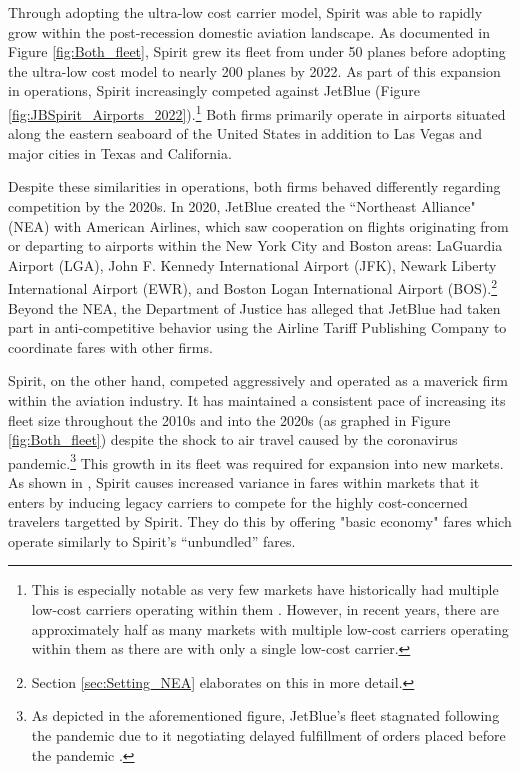\documentclass{article}
\begin{document}
     Through adopting the ultra-low cost carrier model, Spirit was able to rapidly grow within the post-recession domestic aviation landscape. As documented in Figure \ref{fig:Both_fleet}, Spirit grew its fleet from under 50 planes before adopting the ultra-low cost model to nearly 200 planes by 2022. As part of this expansion in operations, Spirit increasingly competed against JetBlue (Figure \ref{fig:JBSpirit_Airports_2022}).\footnote{This is especially notable as very few markets have historically had multiple low-cost carriers operating within them \citep{kwoka_fringe_2016, ciliberto_market_2021}. However, in recent years, there are approximately half as many markets with multiple low-cost carriers operating within them as there are with only a single low-cost carrier.} Both firms primarily operate in airports situated along the eastern seaboard of the United States in addition to Las Vegas and major cities in Texas and California.
	
	Despite these similarities in operations, both firms behaved differently regarding competition by the 2020s.  In 2020, JetBlue created the ``Northeast Alliance" (NEA) with American Airlines, which saw cooperation on flights originating from or departing to airports within the New York City and Boston areas: LaGuardia Airport (LGA), John F. Kennedy International Airport (JFK), Newark Liberty International Airport (EWR), and Boston Logan International Airport (BOS).\footnote{Section \ref{sec:Setting_NEA} elaborates on this in more detail.} Beyond the NEA, the Department of Justice has alleged that JetBlue had taken part in anti-competitive behavior using the Airline Tariff Publishing Company to coordinate fares with other firms. 
	
	Spirit, on the other hand, competed aggressively and operated as  a maverick firm within the aviation industry. It has maintained a consistent pace of increasing its fleet size throughout the 2010s and into the 2020s (as graphed in Figure \ref{fig:Both_fleet}) despite the shock to air travel caused by the coronavirus pandemic.\footnote{As depicted in the aforementioned figure, JetBlue's fleet stagnated following the pandemic due to it negotiating delayed fulfillment of orders placed before the pandemic \citep{bellamy_iii_jetblue_2020, sipinski_jetblue_2020}.} This growth in its fleet was required for expansion into new markets. As shown in \citet{shrago_spirit_2024}, Spirit causes increased variance in fares within markets that it enters by inducing legacy carriers to compete for the highly cost-concerned travelers targetted by Spirit. They do this by offering "basic economy" fares which operate similarly to Spirit's ``unbundled'' fares.
	
\end{document}
